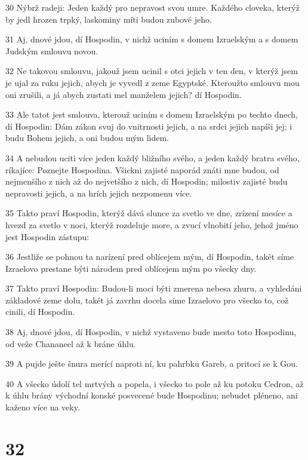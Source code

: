 \par 30 Nýbrž radeji: Jeden každý pro nepravost svou umre. Každého cloveka, kterýž by jedl hrozen trpký, laskominy míti budou zubové jeho.
\par 31 Aj, dnové jdou, dí Hospodin, v nichž uciním s domem Izraelským a s domem Judským smlouvu novou.
\par 32 Ne takovou smlouvu, jakouž jsem ucinil s otci jejich v ten den, v kterýž jsem je ujal za ruku jejich, abych je vyvedl z zeme Egyptské. Kteroužto smlouvu mou oni zrušili, a já abych zustati mel manželem jejich? dí Hospodin.
\par 33 Ale tatot jest smlouva, kterouž uciním s domem Izraelským po techto dnech, dí Hospodin: Dám zákon svuj do vnitrnosti jejich, a na srdci jejich napíši jej; i budu Bohem jejich, a oni budou mým lidem.
\par 34 A nebudou uciti více jeden každý bližního svého, a jeden každý bratra svého, ríkajíce: Poznejte Hospodina. Všickni zajisté naporád znáti mne budou, od nejmenšího z nich až do nejvetšího z nich, dí Hospodin; milostiv zajisté budu nepravosti jejich, a na hrích jejich nezpomenu více.
\par 35 Takto praví Hospodin, kterýž dává slunce za svetlo ve dne, zrízení mesíce a hvezd za svetlo v noci, kterýž rozdeluje more, a zvucí vlnobití jeho, jehož jméno jest Hospodin zástupu:
\par 36 Jestliže se pohnou ta narízení pred oblícejem mým, dí Hospodin, takét síme Izraelovo prestane býti národem pred oblícejem mým po všecky dny.
\par 37 Takto praví Hospodin: Budou-li moci býti zmerena nebesa zhuru, a vyhledáni základové zeme dolu, takét já zavrhu docela síme Izraelovo pro všecko to, což cinili, dí Hospodin.
\par 38 Aj, dnové jdou, dí Hospodin, v nichž vystaveno bude mesto toto Hospodinu, od veže Chananeel až k bráne úhlu.
\par 39 A pujde ješte šnura merící naproti ní, ku pahrbku Gareb, a pritocí se k Gou.
\par 40 A všecko údolí tel mrtvých a popela, i všecko to pole až ku potoku Cedron, až k úhlu brány východní konské posvecené bude Hospodinu; nebudet pléneno, ani kaženo více na veky.

\chapter{32}

